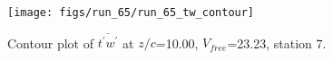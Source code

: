 \begin{figure}[H]
\centering
\texttt{[image: figs/run\_65/run\_65\_tw\_contour]}
\caption{Contour plot of $\overline{t^\prime w^\prime}$ at $z/c$=10.00, $V_{free}$=23.23, station 7.}
\end{figure}


